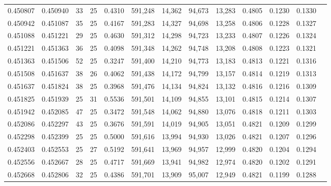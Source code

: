\begin{tabular}{rrrrrrrrrrrrr}
0.450807 & 0.450940 &    33 &  25 &                                     0.4310 & 591,248 &  14,362 &  94,673 &  13,283 & 0.4805 & 0.1230 & 0.1330 \\
0.450942 & 0.451087 &    35 &  25 &                                     0.4167 & 591,283 &  14,327 &  94,698 &  13,258 & 0.4806 & 0.1228 & 0.1327 \\
0.451088 & 0.451221 &    29 &  25 &                                     0.4630 & 591,312 &  14,298 &  94,723 &  13,233 & 0.4807 & 0.1226 & 0.1324 \\
0.451221 & 0.451363 &    36 &  25 &                                     0.4098 & 591,348 &  14,262 &  94,748 &  13,208 & 0.4808 & 0.1223 & 0.1321 \\
0.451363 & 0.451506 &    52 &  25 &                                     0.3247 & 591,400 &  14,210 &  94,773 &  13,183 & 0.4813 & 0.1221 & 0.1316 \\
0.451508 & 0.451637 &    38 &  26 &                                     0.4062 & 591,438 &  14,172 &  94,799 &  13,157 & 0.4814 & 0.1219 & 0.1313 \\
0.451637 & 0.451824 &    38 &  25 &                                     0.3968 & 591,476 &  14,134 &  94,824 &  13,132 & 0.4816 & 0.1216 & 0.1309 \\
0.451825 & 0.451939 &    25 &  31 &                                     0.5536 & 591,501 &  14,109 &  94,855 &  13,101 & 0.4815 & 0.1214 & 0.1307 \\
0.451942 & 0.452085 &    47 &  25 &                                     0.3472 & 591,548 &  14,062 &  94,880 &  13,076 & 0.4818 & 0.1211 & 0.1303 \\
0.452086 & 0.452297 &    43 &  25 &                                     0.3676 & 591,591 &  14,019 &  94,905 &  13,051 & 0.4821 & 0.1209 & 0.1299 \\
0.452298 & 0.452399 &    25 &  25 &                                     0.5000 & 591,616 &  13,994 &  94,930 &  13,026 & 0.4821 & 0.1207 & 0.1296 \\
0.452403 & 0.452553 &    25 &  27 &                                     0.5192 & 591,641 &  13,969 &  94,957 &  12,999 & 0.4820 & 0.1204 & 0.1294 \\
0.452556 & 0.452667 &    28 &  25 &                                     0.4717 & 591,669 &  13,941 &  94,982 &  12,974 & 0.4820 & 0.1202 & 0.1291 \\
0.452668 & 0.452806 &    32 &  25 &                                     0.4386 & 591,701 &  13,909 &  95,007 &  12,949 & 0.4821 & 0.1199 & 0.1288 \\

\end{tabular}
